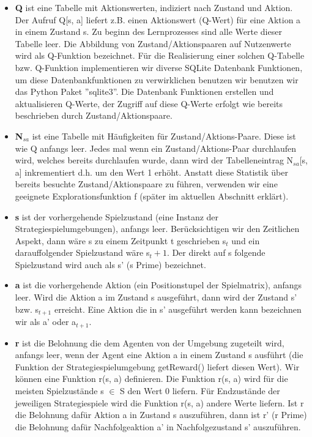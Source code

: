 \begin{itemize}
\item \textbf{Q} ist eine Tabelle mit Aktionswerten, indiziert nach Zustand und Aktion. Der Aufruf Q[s, a] liefert z.B. einen Aktionswert (Q-Wert) für eine Aktion a in einem Zustand s. Zu beginn des Lernprozesses sind alle Werte dieser Tabelle leer. Die Abbildung von Zustand/Aktionspaaren auf Nutzenwerte wird als Q-Funktion bezeichnet. Für die Realisierung einer solchen Q-Tabelle bzw. Q-Funktion implementieren wir diverse SQLite Datenbank Funktionen, um diese Datenbankfunktionen zu verwirklichen benutzen wir benutzen wir das Python Paket ''sqlite3''. Die Datenbank Funktionen erstellen und aktualisieren Q-Werte, der Zugriff auf diese Q-Werte erfolgt wie bereits beschrieben durch Zustand/Aktionspaare.

\item \textbf{N$_{sa}$} ist eine Tabelle mit Häufigkeiten für Zustand/Aktions-Paare.  Diese ist wie Q anfangs leer. Jedes mal wenn ein Zustand/Aktions-Paar durchlaufen wird, welches bereits durchlaufen wurde, dann wird der Tabelleneintrag N$_{sa}$[s, a] inkrementiert d.h. um den Wert 1 erhöht. Anstatt diese Statistik über bereits besuchte Zustand/Aktionspaare zu führen, verwenden wir eine geeignete Explorationsfunktion f (später im aktuellen Abschnitt erklärt).

\item \textbf{s} ist der vorhergehende Spielzustand (eine Instanz der Strategiespielumgebungen), anfangs leer. Berücksichtigen wir den Zeitlichen Aspekt, dann wäre s zu einem Zeitpunkt t geschrieben s${_t}$ und ein darauffolgender Spielzustand wäre s${_t+1}$. Der direkt auf s folgende Spielzustand wird auch als s' (s Prime) bezeichnet.

\item \textbf{a} ist die vorhergehende Aktion (ein Positionstupel der Spielmatrix), anfangs leer. Wird die Aktion a im Zustand s ausgeführt, dann wird der Zustand s' bzw. s$_{t+1}$ erreicht. Eine Aktion die in s' ausgeführt werden kann bezeichnen wir als a' oder a$_{t+1}$.

\item \textbf{r} ist die Belohnung die dem Agenten von der Umgebung zugeteilt wird, anfangs leer, wenn der Agent eine Aktion a in einem Zustand s ausführt (die Funktion der Strategiespielumgebung getReward() liefert diesen Wert). Wir können eine Funktion r(s, a) definieren. Die Funktion r(s, a) wird für die meisten Spielzustände s $\in$ S den Wert 0 liefern. Für Endzustände der jeweiligen Strategiespiele wird die Funktion r(s, a) andere Werte liefern. Ist r die Belohnung dafür Aktion a in Zustand s auszuführen, dann ist r' (r Prime) die Belohnung dafür Nachfolgeaktion a' in Nachfolgezustand s' auszuführen.
\end{itemize}

